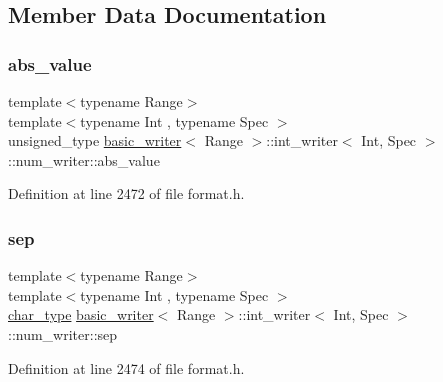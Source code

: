\subsection{Member Data Documentation}
\mbox{\label{structbasic__writer_1_1int__writer_1_1num__writer_a0835673552f2524ceb0abae40a1d1e77}} 
\subsubsection{\texorpdfstring{abs\+\_\+value}{abs\_value}}
{\footnotesize\ttfamily template$<$typename Range$>$ \\
template$<$typename Int , typename Spec $>$ \\
unsigned\+\_\+type \hyperlink{classbasic__writer}{basic\+\_\+writer}$<$ Range $>$\+::int\+\_\+writer$<$ Int, Spec $>$\+::num\+\_\+writer\+::abs\+\_\+value}



Definition at line 2472 of file format.\+h.

\mbox{\label{structbasic__writer_1_1int__writer_1_1num__writer_ab0d3768c7a36ac16af5c05b623287cc9}} 
\subsubsection{\texorpdfstring{sep}{sep}}
{\footnotesize\ttfamily template$<$typename Range$>$ \\
template$<$typename Int , typename Spec $>$ \\
\hyperlink{classbasic__writer_ad6f1b4f79aa917bb28c4f4a37fabf0b7}{char\+\_\+type} \hyperlink{classbasic__writer}{basic\+\_\+writer}$<$ Range $>$\+::int\+\_\+writer$<$ Int, Spec $>$\+::num\+\_\+writer\+::sep}



Definition at line 2474 of file format.\+h.

